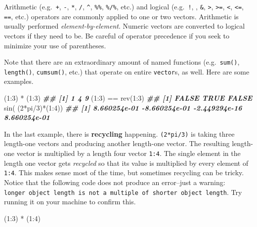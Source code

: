\documentclass[
  12pt,
  krantz2]{krantz}
\makeatletter
\newenvironment{Shaded}{\begin{snugshade}}{\end{snugshade}}
\newcommand{\DecValTok}[1]{\textcolor[rgb]{0.06,0.06,0.06}{#1}}
\newcommand{\DocumentationTok}[1]{\textcolor[rgb]{0.37,0.37,0.37}{\textbf{\textit{#1}}}}
\newcommand{\FunctionTok}[1]{\textcolor[rgb]{0,0,0}{#1}}
\newcommand{\NormalTok}[1]{#1}
\newcommand{\SpecialCharTok}[1]{\textcolor[rgb]{0,0,0}{#1}}
\newenvironment{kframe}{%
\medskip{}
\setlength{\fboxsep}{.8em}
 \def\at@end@of@kframe{}%
 \ifinner\ifhmode%
  \def\at@end@of@kframe{\end{minipage}}%
  \begin{minipage}{\columnwidth}%
 \fi\fi%
 \def\FrameCommand##1{\hskip\@totalleftmargin \hskip-\fboxsep
 \colorbox{shadecolor}{##1}\hskip-\fboxsep
     \hskip-\linewidth \hskip-\@totalleftmargin \hskip\columnwidth}%
 \MakeFramed {\advance\hsize-\width
   \@totalleftmargin\z@ \linewidth\hsize
   \@setminipage}}%
 {\par\unskip\endMakeFramed%
 \at@end@of@kframe}
\renewenvironment{Shaded}{\begin{kframe}}{\end{kframe}}
\makeatother
\begin{document}
Arithmetic (e.g.~\texttt{+}, \texttt{-}, \texttt{*}, \texttt{/}, \texttt{\^{}}, \texttt{\%\%}, \texttt{\%/\%}, etc.) and logical (e.g.~\texttt{!}, \texttt{\textbar{}}, \texttt{\&}, \texttt{\textgreater{}}, \texttt{\textgreater{}=}, \texttt{\textless{}}, \texttt{\textless{}=}, \texttt{==}, etc.) operators are commonly applied to one or two vectors. Arithmetic is usually performed \emph{element-by-element}. Numeric vectors are converted to logical vectors if they need to be. Be careful of operator precedence if you seek to minimize your use of parentheses.

Note that there are an extraordinary amount of named functions (e.g.~\texttt{sum()}, \texttt{length()}, \texttt{cumsum()}, etc.) that operate on entire \texttt{vector}s, as well. Here are some examples.

\begin{Shaded}
\begin{Highlighting}[]
\NormalTok{(}\DecValTok{1}\SpecialCharTok{:}\DecValTok{3}\NormalTok{) }\SpecialCharTok{*}\NormalTok{ (}\DecValTok{1}\SpecialCharTok{:}\DecValTok{3}\NormalTok{)        }
\DocumentationTok{\#\# [1] 1 4 9}
\NormalTok{(}\DecValTok{1}\SpecialCharTok{:}\DecValTok{3}\NormalTok{) }\SpecialCharTok{==} \FunctionTok{rev}\NormalTok{(}\DecValTok{1}\SpecialCharTok{:}\DecValTok{3}\NormalTok{)    }
\DocumentationTok{\#\# [1] FALSE  TRUE FALSE}
\FunctionTok{sin}\NormalTok{( (}\DecValTok{2}\SpecialCharTok{*}\NormalTok{pi}\SpecialCharTok{/}\DecValTok{3}\NormalTok{)}\SpecialCharTok{*}\NormalTok{(}\DecValTok{1}\SpecialCharTok{:}\DecValTok{4}\NormalTok{)) }
\DocumentationTok{\#\# [1]  8.660254e{-}01 {-}8.660254e{-}01 {-}2.449294e{-}16  8.660254e{-}01}
\end{Highlighting}
\end{Shaded}

In the last example, there is \textbf{recycling} happening. \texttt{(2*pi/3)} is taking three length-one vectors and producing another length-one vector. The resulting length-one vector is multiplied by a length four vector \texttt{1:4}. The single element in the length one vector gets \emph{recycled} so that its value is multiplied by every element of \texttt{1:4}.
This makes sense most of the time, but sometimes recycling can be tricky. Notice that the following code does not produce an error--just a warning: \texttt{longer\ object\ length\ is\ not\ a\ multiple\ of\ shorter\ object\ length}. Try running it on your machine to confirm this.

\begin{Shaded}
\begin{Highlighting}[]
\NormalTok{(}\DecValTok{1}\SpecialCharTok{:}\DecValTok{3}\NormalTok{) }\SpecialCharTok{*}\NormalTok{ (}\DecValTok{1}\SpecialCharTok{:}\DecValTok{4}\NormalTok{)}
\end{Highlighting}
\end{Shaded}
\end{document}
